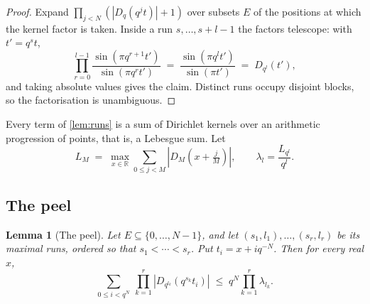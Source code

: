 \documentclass[11pt]{amsart}
\newtheorem{lemma}[theorem]{Lemma}
\theoremstyle{definition}
\theoremstyle{remark}
\begin{document}
\begin{proof}
Expand $\prod_{j<N}\left(|D_{q}(q^{j}t)| + 1\right)$ over subsets $E$ of the positions at which the kernel factor is taken. Inside a run $s, \dots, s+l-1$ the factors telescope: with $t' = q^{s}t$,
\[
  \prod_{r=0}^{l-1} \frac{\sin(\pi q^{r+1}t')}{\sin(\pi q^{r}t')} \;=\; \frac{\sin(\pi q^{l}t')}{\sin(\pi t')} \;=\; D_{q^{l}}(t'),
\]
and taking absolute values gives the claim. Distinct runs occupy disjoint blocks, so the factorisation is unambiguous.
\end{proof}

Every term of \cref{lem:runs} is a sum of Dirichlet kernels over an arithmetic progression of points, that is, a Lebesgue sum. Let
\[
  L_{M} \;=\; \max_{x \in \mathbb{R}} \sum_{0 \le j < M}\left|D_{M}\!\left(x + \tfrac{j}{M}\right)\right|, \qquad \lambda_{l} = \frac{L_{q^{l}}}{q^{l}} .
\]

\subsection{The peel}

\begin{lemma}[The peel]
\label{lem:peel}
Let $E \subseteq \{0,\dots,N-1\}$, and let $(s_{1},l_{1}), \dots, (s_{r},l_{r})$ be its maximal runs, ordered so that $s_{1} < \cdots < s_{r}$. Put $t_{i} = x + iq^{-N}$. Then for every real $x$,
\[
  \sum_{0 \le i < q^{N}}\ \prod_{k=1}^{r} \left|D_{q^{l_{k}}}(q^{s_{k}}t_{i})\right| \;\le\; q^{N} \prod_{k=1}^{r} \lambda_{l_{k}}.
\]
\end{lemma}
\end{document}
